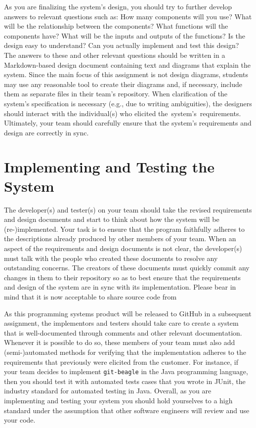 As you are finalizing the system's design, you should try to further develop answers to relevant questions such as: How
many components will you use? What will be the relationship between the components? What functions will the components
have?  What will be the inputs and outputs of the functions?  Is the design easy to understand?  Can you actually
implement and test this design? The answers to these and other relevant questions should be written in a Markdown-based
design document containing text and diagrams that explain the system. Since the main focus of this assignment is not
design diagrams, students may use any reasonable tool to create their diagrams and, if necessary, include them as
separate files in their team's repository.  When clarification of the system's specification is necessary (e.g., due to
writing ambiguities), the designers should interact with the individual(s) who elicited \mbox{the system's
requirements}.  Ultimately, your team should carefully ensure that the system's requirements and design are correctly in
sync.

\section*{Implementing and Testing the System}

The developer(s) and tester(s) on your team should take the revised requirements and design documents and start to think
about how the system will be (re-)implemented. Your task is to ensure that the program faithfully adheres to the descriptions
already produced by other members of your team. When an aspect of the requirements and design documents is not clear,
the developer(s) must talk with the people who created these documents to resolve any outstanding concerns. The creators
of these documents must quickly commit any changes in them to their repository so as to best ensure that the
requirements and design of the system are in sync with its implementation. Please bear in mind that it is now acceptable
to share source code from 

As this programming systems product will be released to GitHub in a subsequent assignment, the implementors and testers
should take care to create a system that is well-documented through comments and other relevant documentation. Whenever
it is possible to do so, these members of your team must also add (semi-)automated methods for verifying that the
implementation adheres to the requirements that previously were elicited from the customer. For instance, if your team
decides to implement {\tt git-beagle} in the Java programming language, then you should test it with automated tests
cases that you wrote in JUnit, the industry standard for automated testing in Java. Overall, as you are implementing and
testing your system you should hold yourselves to a high standard under the assumption that other software engineers
will review and use your code.

